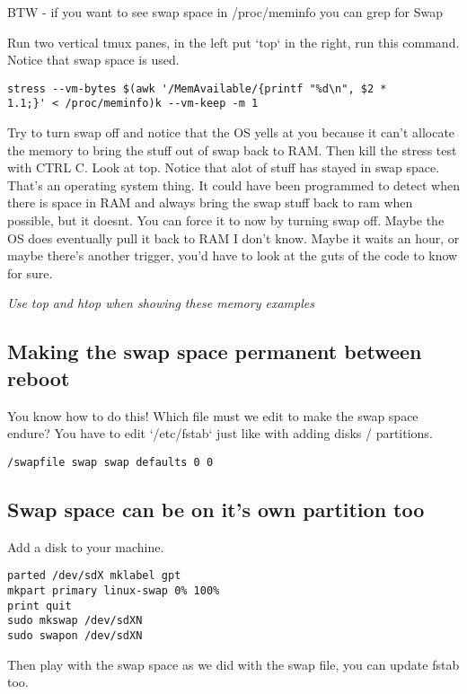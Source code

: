 \documentclass[10pt]{article}
\begin{document}
BTW - if you want to see swap space in /proc/meminfo you can grep for Swap


Run two vertical tmux panes, in the left put `top` in the right, run this
command. Notice that swap space is used.

\begin{lstlisting}
stress --vm-bytes $(awk '/MemAvailable/{printf "%d\n", $2 *
1.1;}' < /proc/meminfo)k --vm-keep -m 1 
\end{lstlisting}

Try to turn swap off and notice that the OS yells at you because it can't
allocate the memory to bring the stuff out of swap back to RAM.  Then kill the
stress test with CTRL C. Look at top. Notice that alot of stuff has stayed in
swap space. That's an operating system thing. It could have been programmed to
detect when there is space in RAM and always bring the swap stuff back to ram
when possible, but it doesnt. You can force it to now by turning swap off. Maybe
the OS does eventually pull it back to RAM I don't know. Maybe it waits an hour,
or maybe there's another trigger, you'd have to look at the guts of the code to
know for sure.

{\LARGE\textit{Use top and htop when showing these memory examples}}

\subsection{Making the swap space permanent between reboot}

You know how to do this! Which file must we edit to make the swap space endure?
You have to edit `/etc/fstab` just like with adding disks / partitions.

\begin{lstlisting}
/swapfile swap swap defaults 0 0 
\end{lstlisting}

\subsection{Swap space can be on it's own partition too}
Add a disk to your machine.

\begin{lstlisting}
parted /dev/sdX mklabel gpt
mkpart primary linux-swap 0% 100%
print quit
sudo mkswap /dev/sdXN
sudo swapon /dev/sdXN 
\end{lstlisting}

Then play with the swap space as we did with the swap file, you can update fstab
too.
\end{document}

